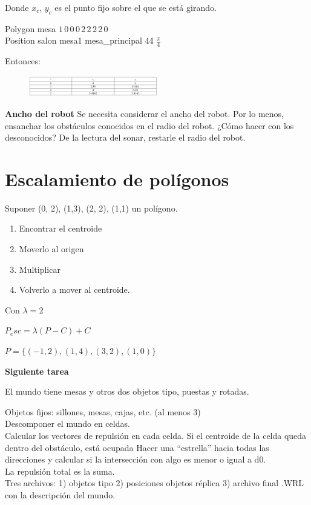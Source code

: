 Donde $x_c$, $y_c$ es el punto fijo sobre el que se está girando.

\begin{ejemplo}
	Polygon mesa $1 \, 0 \, 0\, 0\, 2\, 2\, 2\, 2\, 0$ \\	
	Position salon mesa1 mesa\_principal 44 $\frac{\pi}{4}$
\end{ejemplo}

Entonces:

\begin{figure}[h!]
	\centering
	\includegraphics[width=0.5\textwidth]{images/img69.png}
	\label{figura69}
\end{figure}

\textbf{Ancho del robot}
Se necesita considerar el ancho del robot. Por lo menos, ensanchar los obstáculos conocidos en el radio del
robot.
¿Cómo hacer con los desconocidos? De la lectura del sonar, restarle el radio del robot.

\section{Escalamiento de polígonos}

Suponer (0, 2), (1,3), (2, 2), (1,1) un polígono.


\begin{enumerate}[1.]
	\item Encontrar el centroide
	\item Moverlo al origen
	\item Multiplicar
	\item Volverlo a mover al centroide.
\end{enumerate}


Con $\lambda =2$


$P_esc = \lambda (P - C) + C$

$P = \{(-1,2),(1,4),(3,2),(1,0)\}$

\begin{scaja}
	\textbf{Siguiente tarea}
	
	El mundo tiene mesas y otros dos objetos tipo, puestas y rotadas.
	
	Objetos fijos: sillones, mesas, cajas, etc. (al menos 3)
	\\
	
	Descomponer el mundo en celdas.
	\\
	
	Calcular los vectores de repulsión en cada celda.
	Si el centroide de la celda queda dentro del obstáculo, está ocupada
	Hacer una “estrella” hacia todas las direcciones y calcular si la intersección con algo es menor o igual a d0.
	\\
	La repulsión total es la suma.
	\\	
	
	Tres archivos: 1) objetos tipo 2) posiciones objetos réplica 3) archivo final .WRL con la descripción del
	mundo.
\end{scaja}


